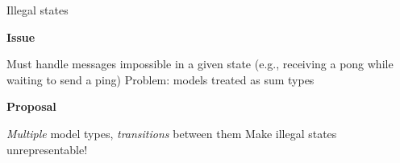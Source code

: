 \documentclass[11.5pt, aspectratio=169]{beamer}
\begin{document}
\begin{frame}{Illegal states}
  \begin{fullpageitemize}
    \item {\LARGE \textbf{Issue}}
      \begin{itemize}
        \itemR Must handle messages impossible in a given state
          (e.g., receiving a pong while waiting to send a ping)
        \itemR Problem: models treated as sum types
      \end{itemize}
      \vspace{0.25em}
    \item {\LARGE \textbf{Proposal}}
      \begin{itemize}
        \itemR \emph{Multiple} model types, \emph{transitions} between them
        \itemR Make illegal states unrepresentable!
      \end{itemize}
  \end{fullpageitemize}
\end{frame}
\end{document}
